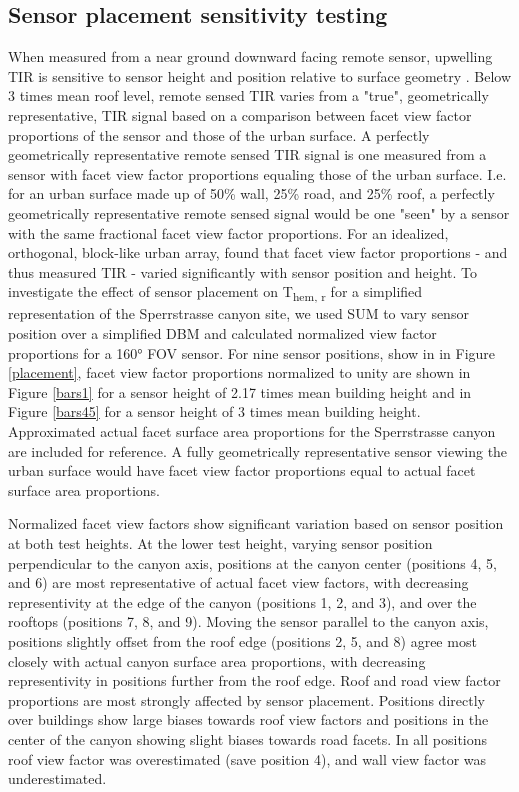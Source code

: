 \begin{bibunit}
\section{Sensor placement sensitivity testing} \label{Methodological limitations and considerations}

 When measured from a near ground downward facing remote sensor, upwelling TIR is sensitive to sensor height and position relative to surface geometry \citep{Adderley2015, Roberts2010}. Below 3 times mean roof level, remote sensed TIR varies from a "true", geometrically representative, TIR signal based on a comparison between facet view factor proportions of the sensor and those of the urban surface. A perfectly geometrically representative remote sensed TIR signal is one measured from a sensor with facet view factor proportions equaling those of the urban surface. I.e. for an urban surface made up of 50\% wall, 25\% road, and 25\% roof, a perfectly geometrically representative remote sensed signal would be one "seen" by a sensor with the same fractional facet view factor proportions. For an idealized, orthogonal, block-like urban array, \citet{Roberts2010} found that facet view factor proportions - and thus measured TIR - varied significantly with sensor position and height. To investigate the effect of sensor placement on T\textsubscript{hem, r} for a simplified representation of the Sperrstrasse canyon site, we used SUM to vary sensor position over a simplified DBM and calculated normalized view factor proportions for a 160\si{\degree} FOV sensor. For nine sensor positions, show in in Figure \ref{placement}, facet view factor proportions normalized to unity are shown in Figure \ref{bars1} for a sensor height of 2.17 times mean building height and in Figure \ref{bars45} for a sensor height of 3 times mean building height. Approximated actual facet surface area proportions for the Sperrstrasse canyon are included for reference. A fully geometrically representative sensor viewing the urban surface would have facet view factor proportions equal to actual facet surface area proportions. 
  
 Normalized facet view factors show significant variation based on sensor position at both test heights. At the lower test height, varying sensor position perpendicular to the canyon axis, positions at the canyon center (positions 4, 5, and 6) are most representative of actual facet view factors, with decreasing representivity at the edge of the canyon (positions 1, 2, and 3), and over the rooftops (positions 7, 8, and 9). Moving the sensor parallel to the canyon axis, positions slightly offset from the roof edge (positions 2, 5, and 8) agree most closely with actual canyon surface area proportions, with decreasing representivity in positions further from the roof edge. Roof and road view factor proportions are most strongly affected by sensor placement. Positions directly over buildings show large biases towards roof view factors and positions in the center of the canyon showing slight biases towards road facets. In all positions roof view factor was overestimated (save position 4), and wall view factor was underestimated.
 

\end{bibunit}
